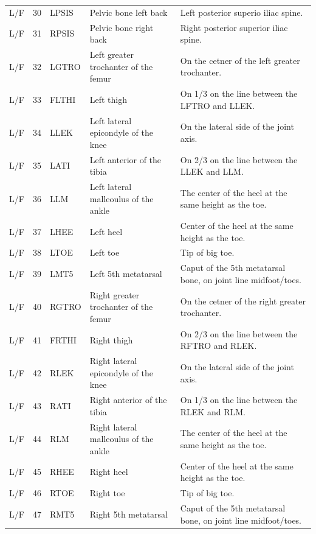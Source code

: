 \documentclass[fleqn,12pt]{wlpeerj}
\begin{document}
\begin{table}
\begin{tabular}{lrlll}
    L/F & 30 & LPSIS & Pelvic bone left back                 & Left posterior superio iliac spine. \\
    L/F & 31 & RPSIS & Pelvic bone right back                & Right posterior superior iliac spine. \\
    L/F & 32 & LGTRO & Left greater trochanter of the femur  & On the cetner of the left greater trochanter. \\
    L/F & 33 & FLTHI & Left thigh                            & On 1/3 on the line between the LFTRO and LLEK. \\
    L/F & 34 & LLEK  & Left lateral epicondyle of the knee   & On the lateral side of the joint axis. \\
    L/F & 35 & LATI  & Left anterior of the tibia            & On 2/3 on the line between the LLEK and LLM. \\
    L/F & 36 & LLM   & Left lateral malleoulus of the ankle  & The center of the heel at the same height as the toe. \\
    L/F & 37 & LHEE  & Left heel                             & Center of the heel at the same height as the toe. \\
    L/F & 38 & LTOE  & Left toe                              & Tip of big toe. \\
    L/F & 39 & LMT5  & Left 5th metatarsal                   & Caput of the 5th metatarsal bone, on joint line midfoot/toes. \\
    L/F & 40 & RGTRO & Right greater trochanter of the femur & On the cetner of the right greater trochanter. \\
    L/F & 41 & FRTHI & Right thigh                           & On 2/3 on the line between the RFTRO and RLEK. \\
    L/F & 42 & RLEK  & Right lateral epicondyle of the knee  & On the lateral side of the joint axis. \\
    L/F & 43 & RATI  & Right anterior of the tibia           & On 1/3 on the line between the RLEK and RLM. \\
    L/F & 44 & RLM   & Right lateral malleoulus of the ankle & The center of the heel at the same height as the toe. \\
    L/F & 45 & RHEE  & Right heel                            & Center of the heel at the same height as the toe. \\
    L/F & 46 & RTOE  & Right toe                             & Tip of big toe. \\
    L/F & 47 & RMT5  & Right 5th metatarsal                  & Caput of the 5th metatarsal bone, on joint line midfoot/toes. \\
    \bottomrule
  \end{tabular}
  \label{tab:marker-labels}
\end{table}
\end{document}
